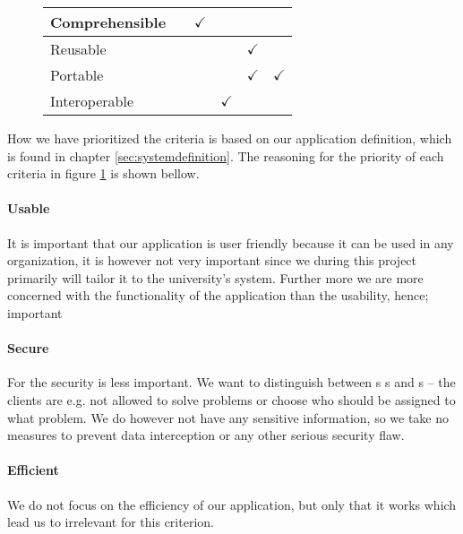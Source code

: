 \begin{figure}[htbp]
\begin{tabular}{| l | m{} | m{}| m{}| m{}|m{}|}
		Comprehensible  		& 																				& \multicolumn{1}{c|}{$\checkmark$} 		& 																		& 																	& 																	\\ \hline
		Reusable  					& 																				& 																			& 																		& \multicolumn{1}{c|}{$\checkmark$} & 																	\\ \hline
		Portable 						& 																				& 																			& 																		& \multicolumn{1}{c|}{$\checkmark$} &	\multicolumn{1}{c|}{$\checkmark$} \\ \hline
		Interoperable 			& 																				& 																			& \multicolumn{1}{c|}{$\checkmark$} 	& 																	& 																	\\ \hline
		\end{tabular}
	\label{fig:prioritizedCrit}
\end{figure}

How we have prioritized the criteria is based on our application definition, which is found in chapter \ref{sec:systemdefinition}. The reasoning for the priority of each criteria in figure \ref{fig:prioritizedCrit} is shown bellow.

\paragraph{Usable}
It is important that our application is user friendly because it can be used in any organization, it is however not very important since we during this project primarily will tailor it to the university's system.
Further more we are more concerned with the functionality of the application than the usability, hence; important 
\paragraph{Secure}
For the \hdesk[] security is less important. We want to distinguish between \aclient s \astaff s and \admin s -- the clients are e.g. not allowed to solve problems or choose who should be assigned to what problem.
We do however not have any sensitive information, so we take no measures to prevent data interception or any other serious security flaw.
\paragraph{Efficient}
We do not focus on the efficiency of our application, but only that it works which lead us to irrelevant for this criterion.
